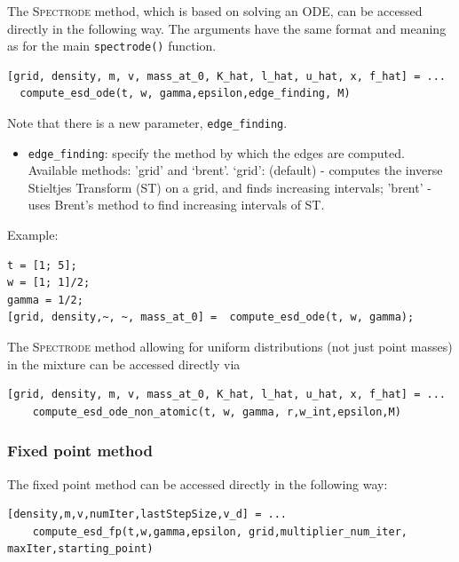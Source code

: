 \documentclass[english,11pt]{article} %
\begin{document}
\subsubsection{}

The \textsc{Spectrode} method, which is based on solving an ODE, can be accessed directly in the following way. The arguments have the same format and meaning as for the main \verb+spectrode()+ function. 

\begin{verbatim}
[grid, density, m, v, mass_at_0, K_hat, l_hat, u_hat, x, f_hat] = ...
  compute_esd_ode(t, w, gamma,epsilon,edge_finding, M)
\end{verbatim}

Note that there is a new parameter, \verb+edge_finding+. 
\begin{itemize}
\item \verb+edge_finding+:  specify the method by which the edges are computed. Available methods: 
'grid' and `brent'. `grid':  (default) - computes the inverse Stieltjes Transform (ST) on a grid, and finds increasing intervals; 
'brent' - uses Brent's method to find increasing intervals of ST.
\end{itemize}

Example:

\begin{verbatim}
t = [1; 5]; 
w = [1; 1]/2;
gamma = 1/2; 
[grid, density,~, ~, mass_at_0] =  compute_esd_ode(t, w, gamma);
\end{verbatim}

The \textsc{Spectrode} method allowing for uniform distributions (not just point masses) in the mixture can be accessed directly via

\begin{verbatim}
[grid, density, m, v, mass_at_0, K_hat, l_hat, u_hat, x, f_hat] = ...
    compute_esd_ode_non_atomic(t, w, gamma, r,w_int,epsilon,M)
\end{verbatim}


\subsubsection{Fixed point method}

The fixed point method can be accessed directly in the following way: 

\begin{verbatim}
[density,m,v,numIter,lastStepSize,v_d] = ...
    compute_esd_fp(t,w,gamma,epsilon, grid,multiplier_num_iter, maxIter,starting_point)
\end{verbatim}
\end{document}
